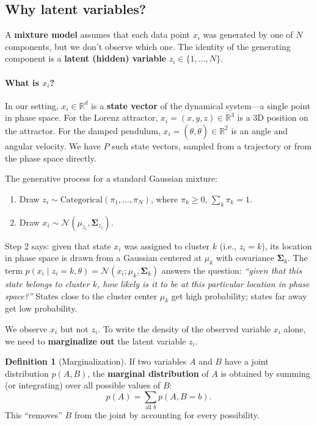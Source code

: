 \documentclass[11pt]{article}
\theoremstyle{definition}
\newtheorem{definition}{Definition}[section]
\theoremstyle{plain}
\theoremstyle{remark}
\newcommand{\R}{\mathbb{R}}
\newcommand{\Sv}{\boldsymbol{\Sigma}}
\begin{document}
\subsection{Why latent variables?}

A \textbf{mixture model} assumes that each data point $x_i$ was generated by one of $N$ components, but we don't observe which one. The identity of the generating component is a \textbf{latent (hidden) variable} $z_i\in\{1,\dots,N\}$.

\paragraph{What is $x_i$?} In our setting, $x_i\in\R^d$ is a \textbf{state vector} of the dynamical system---a single point in phase space. For the Lorenz attractor, $x_i=(x,y,z)\in\R^3$ is a 3D position on the attractor. For the damped pendulum, $x_i=(\theta,\dot{\theta})\in\R^2$ is an angle and angular velocity. We have $P$ such state vectors, sampled from a trajectory or from the phase space directly.

The generative process for a standard Gaussian mixture:
\begin{enumerate}[leftmargin=*,itemsep=0pt]
  \item Draw $z_i\sim\mathrm{Categorical}(\pi_1,\dots,\pi_N)$, where $\pi_k\geq 0$, $\sum_k\pi_k=1$.
  \item Draw $x_i\sim\mathcal{N}(\mu_{z_i},\Sv_{z_i})$.
\end{enumerate}
Step 2 says: given that state $x_i$ was assigned to cluster $k$ (i.e., $z_i=k$), its location in phase space is drawn from a Gaussian centered at $\mu_k$ with covariance $\Sv_k$. The term $p(x_i\mid z_i=k,\theta)=\mathcal{N}(x_i;\mu_k,\Sv_k)$ answers the question: \emph{``given that this state belongs to cluster $k$, how likely is it to be at this particular location in phase space?''} States close to the cluster center $\mu_k$ get high probability; states far away get low probability.

We observe $x_i$ but not $z_i$. To write the density of the observed variable $x_i$ alone, we need to \textbf{marginalize out} the latent variable $z_i$.

\begin{definition}[Marginalization]
If two variables $A$ and $B$ have a joint distribution $p(A,B)$, the \textbf{marginal distribution} of $A$ is obtained by summing (or integrating) over all possible values of $B$:
\begin{equation}
  p(A) = \sum_{\text{all } b} p(A, B=b).
\end{equation}
This ``removes'' $B$ from the joint by accounting for every possibility.
\end{definition}
\end{document}
